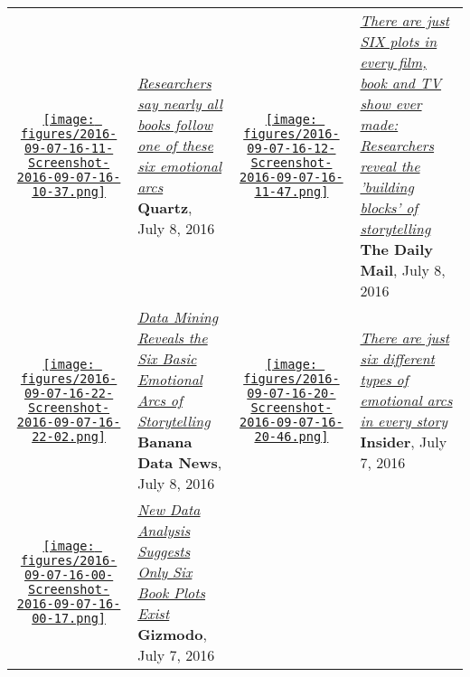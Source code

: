 \begin{longtable}{c p{7.5cm} c p{7.5cm} }
\rule{0pt}{5ex} 
\parbox[c]{1.1cm}{ \href{http://qz.com/726057/researchers-say-nearly-all-books-follow-one-of-these-six-emotional-arcs/}{\texttt{[image: figures/2016-09-07-16-11-Screenshot-2016-09-07-16-10-37.png]}} }
& \parbox[c]{7.5cm}{ {\small \textcolor{blue}{\textit{\href{http://qz.com/726057/researchers-say-nearly-all-books-follow-one-of-these-six-emotional-arcs/} {Researchers say nearly all books follow one of these six emotional arcs} } } }\\ \textbf{Quartz}, July 8, 2016 }  &  
\parbox[c]{1.1cm}{ \href{http://www.dailymail.co.uk/sciencetech/article-3679510/There-just-SIX-plots-film-book-TV-Researchers-reveal-building-blocks-storytelling.html}{\texttt{[image: figures/2016-09-07-16-12-Screenshot-2016-09-07-16-11-47.png]}} }
& \parbox[c]{7.5cm}{ {\small \textcolor{blue}{\textit{\href{http://www.dailymail.co.uk/sciencetech/article-3679510/There-just-SIX-plots-film-book-TV-Researchers-reveal-building-blocks-storytelling.html} {There are just SIX plots in every film, book and TV show ever made: Researchers reveal the 'building blocks' of storytelling} } } }\\ \textbf{The Daily Mail}, July 8, 2016 }  \\
\rule{0pt}{5ex} 
\parbox[c]{1.1cm}{ \href{http://bananadata.tumblr.com/post/147094542861/data-mining-reveals-the-six-basic-emotional-arcs}{\texttt{[image: figures/2016-09-07-16-22-Screenshot-2016-09-07-16-22-02.png]}} }
& \parbox[c]{7.5cm}{ {\small \textcolor{blue}{\textit{\href{http://bananadata.tumblr.com/post/147094542861/data-mining-reveals-the-six-basic-emotional-arcs} {Data Mining Reveals the Six Basic Emotional Arcs of Storytelling} } } }\\ \textbf{Banana Data News}, July 8, 2016 }  &  
\parbox[c]{1.1cm}{ \href{http://www.thisisinsider.com/6-different-types-of-emotional-arcs-in-every-story-2016-7}{\texttt{[image: figures/2016-09-07-16-20-Screenshot-2016-09-07-16-20-46.png]}} }
& \parbox[c]{7.5cm}{ {\small \textcolor{blue}{\textit{\href{http://www.thisisinsider.com/6-different-types-of-emotional-arcs-in-every-story-2016-7} {There are just six different types of emotional arcs in every story} } } }\\ \textbf{Insider}, July 7, 2016 }  \\
\rule{0pt}{5ex} 
\parbox[c]{1.1cm}{ \href{http://gizmodo.com/data-analysis-suggests-there-exist-only-six-book-plots-1783263768}{\texttt{[image: figures/2016-09-07-16-00-Screenshot-2016-09-07-16-00-17.png]}} }
& \parbox[c]{7.5cm}{ {\small \textcolor{blue}{\textit{\href{http://gizmodo.com/data-analysis-suggests-there-exist-only-six-book-plots-1783263768} {New Data Analysis Suggests Only Six Book Plots Exist} } } }\\ \textbf{Gizmodo}, July 7, 2016 }  &  

\end{longtable}
